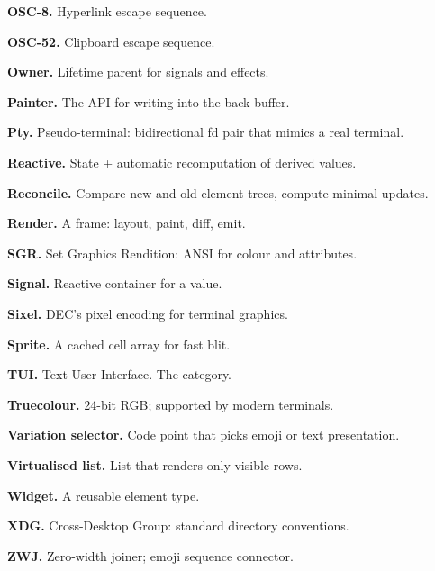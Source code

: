 \textbf{OSC-8.} Hyperlink escape sequence.

\textbf{OSC-52.} Clipboard escape sequence.

\textbf{Owner.} Lifetime parent for signals and effects.

\textbf{Painter.} The API for writing into the back buffer.

\textbf{Pty.} Pseudo-terminal: bidirectional fd pair that
mimics a real terminal.

\textbf{Reactive.} State + automatic recomputation of
derived values.

\textbf{Reconcile.} Compare new and old element trees,
compute minimal updates.

\textbf{Render.} A frame: layout, paint, diff, emit.

\textbf{SGR.} Set Graphics Rendition: ANSI for colour and
attributes.

\textbf{Signal.} Reactive container for a value.

\textbf{Sixel.} DEC's pixel encoding for terminal graphics.

\textbf{Sprite.} A cached cell array for fast blit.

\textbf{TUI.} Text User Interface. The category.

\textbf{Truecolour.} 24-bit RGB; supported by modern
terminals.

\textbf{Variation selector.} Code point that picks emoji
or text presentation.

\textbf{Virtualised list.} List that renders only visible
rows.

\textbf{Widget.} A reusable element type.

\textbf{XDG.} Cross-Desktop Group: standard directory
conventions.

\textbf{ZWJ.} Zero-width joiner; emoji sequence connector.
